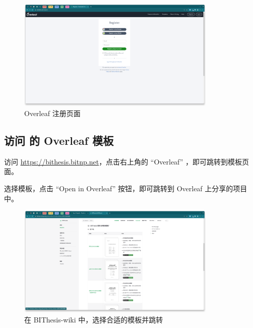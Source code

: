 \begin{figure}[H]
  \begin{center}
    \includegraphics[width=0.85\textwidth]{imgs/overleaf-register.png}
  \end{center}
  \caption{Overleaf 注册页面}
  \label{fig:overleaf-register}
\end{figure}


\subsection{访问 \BIThesis 的 Overleaf 模板}

访问 \url{https://bithesis.bitnp.net}，点击右上角的 ``Overleaf'' ，即可跳转到模板页面。

选择模板，点击 ``Open in Overleaf'' 按钮，即可跳转到 Overleaf 上分享的项目中。


\begin{figure}[H]
  \begin{center}
    \includegraphics[width=0.85\textwidth]{imgs/overleaf-choose-template.png}
  \end{center}
  \caption{在 BIThesis-wiki 中，选择合适的模板并跳转}
  \label{fig:overleaf-template}
\end{figure}

